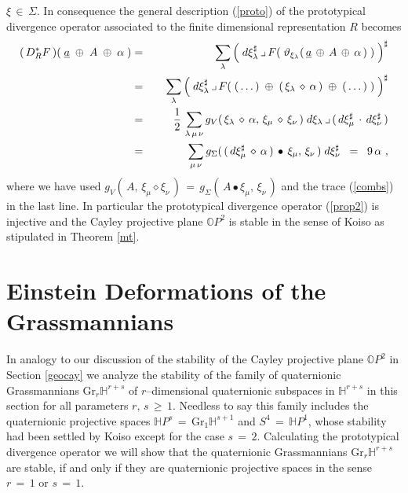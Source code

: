 \documentclass[12pt]{article}
\def\#{\sharp}
\def\Gr{\mathrm{Gr}}
\def\H{\mathbb{H}}
\def\ins{\lrcorner}
\def\O{\mathbb{O}}
\def\Z{\Sigma}
\begin{document}
 $\xi\,\in\,\Z$. In consequence the general description (\ref{proto}) of
 the prototypical divergence operator associated to the finite dimensional
 representation $R$ becomes
 \begin{eqnarray*}
  (\,D^*_RF\,)(\;\underline a\;\oplus\;A\;\oplus\;\alpha\;)
  &=&
  \hphantom{\frac12}\,\sum_\lambda
  \Big(\;d\xi^\#_\lambda\,\ins\,F(\;\vartheta_{\xi_\lambda}
  (\,\underline a\,\oplus\,A\,\oplus\,\alpha\,)\;)\;\Big)^\#
  \\
  &=&
  \hphantom{\frac12}\,\sum_\lambda
  \Big(\;d\xi^\#_\lambda\,\ins\,F(\;(\,\ldots\,)\;\oplus\;(\,\xi_\lambda
  \,\diamond\,\alpha\,)\;\oplus\;(\,\ldots\,)\;)\;\Big)^\#
  \\
  &=&
  \frac12\,\sum_{\lambda\,\mu\,\nu}
  g_V(\,\xi_\lambda\,\diamond\,\alpha,\,\xi_\mu\,\diamond\,\xi_\nu\,)\;
  d\xi_\lambda\,\lrcorner\,(\,d\xi^\#_\mu\,\cdot\,d\xi^\#_\nu\,)
  \\
  &=&
  \hphantom{\frac12}\,\sum_{\mu\,\nu}
  g_\Z(\,(\,d\xi^\#_\mu\,\diamond\,\alpha\,)\,\bullet\,\xi_\mu,
  \,\xi_\nu\,)\;d\xi^\#_\nu
  \;\;=\;\;
  9\,\alpha\ ,
 \end{eqnarray*}
 where we have used $g_V(\,A,\,\xi_\mu\diamond\xi_\nu\,)\,=\,g_\Z(\,A\bullet
 \xi_\mu,\,\xi_\nu\,)$ and the trace (\ref{combs}) in the last line. In
 particular the prototypical divergence operator (\ref{prop2}) is injective
 and the Cayley projective plane $\O P^2$ is stable in the sense of Koiso
 as stipulated in Theorem \ref{mt}.
%
\section{Einstein Deformations of the Grassmannians}
\label{eingr}
%
 In analogy to our discussion of the stability of the Cayley projective plane
 $\O P^2$ in Section \ref{geocay} we analyze the stability of the family
 of quaternionic Grassmannians $\Gr_r\H^{r+s}$ of $r$--dimensional quaternionic
 subspaces in $\H^{r+s}$ in this section for all parameters $r,\,s\,\geq\,1$.
 Needless to say this family includes the quaternionic projective spaces
 $\H P^s\,=\,\Gr_1\H^{s+1}$ and $S^4\,=\,\H P^1$, whose stability had been
 settled by Koiso except for the case $s\,=\,2$. Calculating the prototypical
 divergence operator we will show that the quaternionic Grassmannians
 $\Gr_r\H^{r+s}$ are stable, if and only if they are quaternionic projective
 spaces in the sense $r\,=\,1$ or $s\,=\,1$.
\end{document}
